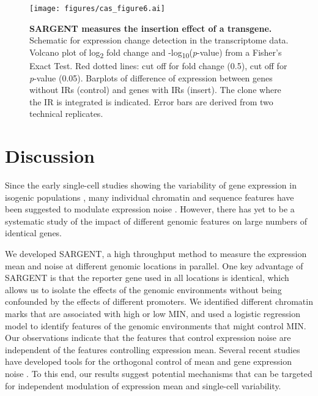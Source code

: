 \begin{figure}[tbp]  
    \centering
    \texttt{[image: figures/cas\_figure6.ai]}
    \caption[SARGENT measures the insertion effect of a transgene.]{%
        \textbf{SARGENT measures the insertion effect of a transgene.}
        Schematic for expression change detection in the transcriptome data.
        Volcano plot of log\textsubscript{2} fold change and -log\textsubscript{10}(\textit{p}-value) from a Fisher’s Exact Test. Red dotted lines: cut off for fold change (0.5), cut off for \textit{p}-value (0.05).
        Barplots of difference of expression between genes without IRs (control) and genes with IRs (insert). The clone where the IR is integrated is indicated. Error bars are derived from two technical replicates.
    }
    \label{fig:cas_figure6}
\end{figure}

\section{Discussion}

Since the early single-cell studies showing the variability of gene expression in isogenic populations \cite{elowitzmb_swainps:StochasticGene2002}, many individual chromatin and sequence features have been suggested to modulate expression noise \cite{raja_vanoudenaardena:NatureNurture2008, raja_tyagis:StochasticMRNA2006,bonnyar_el-samadh:OrthogonalControl2021, desairv_weinbergerls:DNARepair2021}. However, there has yet to be a systematic study of the impact of different genomic features on large numbers of identical genes. 
   
We developed SARGENT, a high throughput method to measure the expression mean and noise at different genomic locations in parallel. One key advantage of SARGENT is that the reporter gene used in all locations is identical, which allows us to isolate the effects of the genomic environments without being confounded by the effects of different promoters. We identified different chromatin marks that are associated with high or low MIN, and used a logistic regression model to identify features of the genomic environments that might control MIN. Our observations indicate that the features that control expression noise are independent of the features controlling expression mean. Several recent studies have developed tools for the orthogonal control of mean and gene expression noise \cite{bonnyar_el-samadh:OrthogonalControl2021,benzingerd_khammashm:PulsatileInputs2018, michaelsys_fulgata:PreciseTuning2019}. To this end, our results suggest potential mechanisms that can be targeted for independent modulation of expression mean and single-cell variability. 

